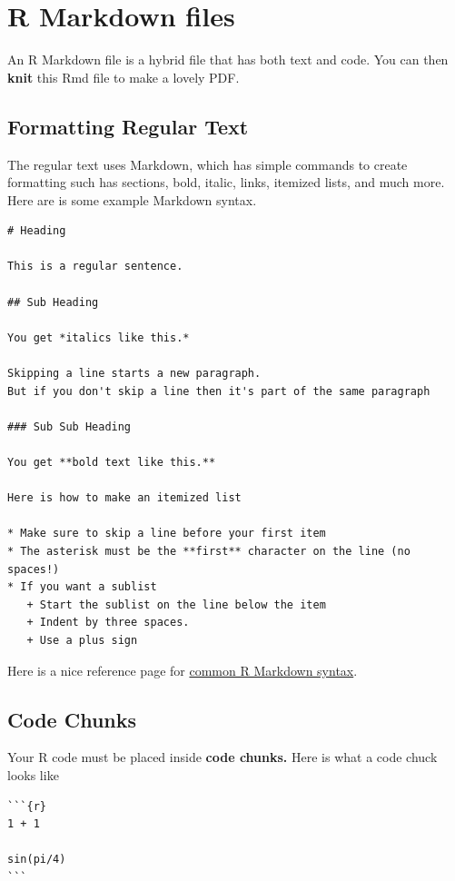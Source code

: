 \documentclass[
]{book}
\begin{document}
\hypertarget{r-markdown-files}{%
\section{R Markdown files}\label{r-markdown-files}}

An R Markdown file is a hybrid file that has both text and code. You can then \textbf{knit} this Rmd file to make a lovely PDF.

\hypertarget{formatting-regular-text}{%
\subsection{Formatting Regular Text}\label{formatting-regular-text}}

The regular text uses Markdown, which has simple commands to create formatting such has sections, bold, italic, links, itemized lists, and much more. Here are is some example Markdown syntax.

\begin{verbatim}
# Heading 

This is a regular sentence.

## Sub Heading

You get *italics like this.* 

Skipping a line starts a new paragraph.
But if you don't skip a line then it's part of the same paragraph

### Sub Sub Heading

You get **bold text like this.**

Here is how to make an itemized list

* Make sure to skip a line before your first item
* The asterisk must be the **first** character on the line (no spaces!)
* If you want a sublist
   + Start the sublist on the line below the item
   + Indent by three spaces.
   + Use a plus sign
\end{verbatim}

Here is a nice reference page for \href{https://rmarkdown.rstudio.com/authoring_basics.html}{common R Markdown syntax}.

\hypertarget{code-chunks}{%
\subsection{Code Chunks}\label{code-chunks}}

Your R code must be placed inside \textbf{code chunks.} Here is what a code chuck looks like

\begin{verbatim}
```{r}
1 + 1

sin(pi/4)
```
\end{verbatim}
\end{document}
